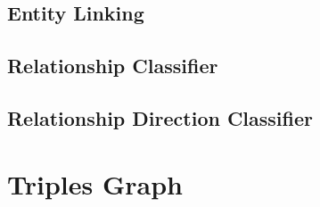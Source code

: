 \documentclass[11pt,a4paper]{article}
\begin{document}
\subsection{Entity Linking}
\label{subsec:ent_linking}


\subsection{Relationship Classifier}
\label{subsec:rel_classifier}

\subsection{Relationship Direction Classifier}
\label{subsec:rel_direction}






\section{Triples Graph}
\label{sec:triples_graph}








\end{document}

